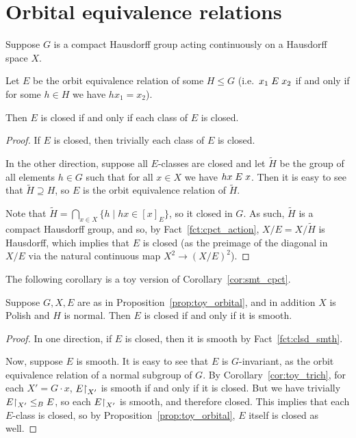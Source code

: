 	\section{Orbital equivalence relations}
	\begin{prop}
		\label{prop:toy_orbital}
		Suppose $G$ is a compact Hausdorff group acting continuously on a Hausdorff space $X$.
		
		Let $E$ be the orbit equivalence relation of some $H\leq G$ (i.e.\ $x_1\mathrel{E} x_2$ if and only if for some $h\in H$ we have $hx_1=x_2$).
		
		Then $E$ is closed if and only if each class of $E$ is closed.
	\end{prop}
	\begin{proof}
		If $E$ is closed, then trivially each class of $E$ is closed.
		
		In the other direction, suppose all $E$-classes are closed and let $\tilde H$ be the group of all elements $h\in G$ such that for all $x\in X$ we have $hx \mathrel{E} x$. Then it is easy to see that $\tilde H\supseteq H$, so $E$ is the orbit equivalence relation of $\tilde H$.
		
		Note that $\tilde H=\bigcap_{x\in X} \{h\mid hx\in [x]_E \}$, so it closed in $G$. As such, $\tilde H$ is a compact Hausdorff group, and so, by Fact~\ref{fct:cpct_action}, $X/E=X/\tilde H$ is Hausdorff, which implies that $E$ is closed (as the preimage of the diagonal in $X/E$ via the natural continuous map $X^2\to (X/E)^2$).
	\end{proof}
	The following corollary is a toy version of Corollary~\ref{cor:smt_cpct}.
	\begin{cor}
		\label{cor:toy_orbital}
		Suppose $G,X,E$ are as in Proposition~\ref{prop:toy_orbital}, and in addition $X$ is Polish and $H$ is normal. Then $E$ is closed if and only if it is smooth.
	\end{cor}
	\begin{proof}
		In one direction, if $E$ is closed, then it is smooth by Fact~\ref{fct:clsd_smth}.
		
		Now, suppose $E$ is smooth.
		It is easy to see that $E$ is $G$-invariant, as the orbit equivalence relation of a normal subgroup of $G$. By Corollary~\ref{cor:toy_trich}, for each $X'=G\cdot x$, $E\mathord{\upharpoonright}_{X'}$ is smooth if and only if it is closed. But we have trivially $E\mathord{\upharpoonright}_{X'}\leq_B E$, so each $E\mathord{\upharpoonright}_{X'}$ is smooth, and therefore closed. This implies that each $E$-class is closed, so by Proposition~\ref{prop:toy_orbital}, $E$ itself is closed as well.
	\end{proof}
	
